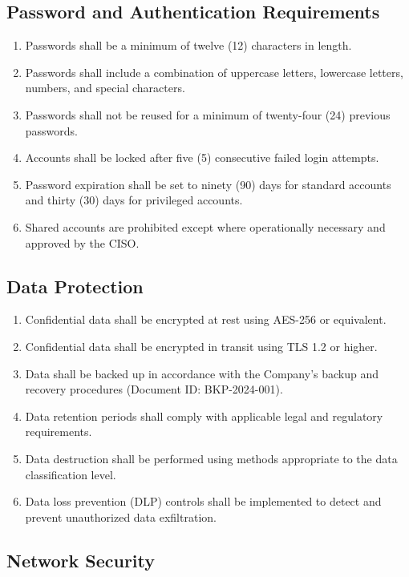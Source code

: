 \documentclass[
    language=english,
    doctype=policy-document,
    institution=none,
]{../../omnilatex}
\begin{document}
\subsection{Password and Authentication Requirements}

\begin{enumerate}[label=\textbf{\arabic*.}]
    \item Passwords shall be a minimum of twelve (12) characters in length.
    \item Passwords shall include a combination of uppercase letters, lowercase letters, numbers, and special characters.
    \item Passwords shall not be reused for a minimum of twenty-four (24) previous passwords.
    \item Accounts shall be locked after five (5) consecutive failed login attempts.
    \item Password expiration shall be set to ninety (90) days for standard accounts and thirty (30) days for privileged accounts.
    \item Shared accounts are prohibited except where operationally necessary and approved by the CISO.
\end{enumerate}

\subsection{Data Protection}

\begin{enumerate}[label=\textbf{\arabic*.}]
    \item Confidential data shall be encrypted at rest using AES-256 or equivalent.
    \item Confidential data shall be encrypted in transit using TLS 1.2 or higher.
    \item Data shall be backed up in accordance with the Company's backup and recovery procedures (Document ID: BKP-2024-001).
    \item Data retention periods shall comply with applicable legal and regulatory requirements.
    \item Data destruction shall be performed using methods appropriate to the data classification level.
    \item Data loss prevention (DLP) controls shall be implemented to detect and prevent unauthorized data exfiltration.
\end{enumerate}

\subsection{Network Security}
\end{document}
